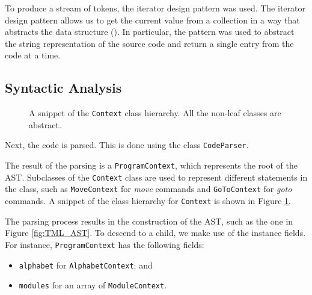 To produce a stream of tokens, the iterator design pattern was used. The iterator design pattern allows us to get the current value from a collection in a way that abstracts the data structure (\cite{gamma1995design}). In particular, the pattern was used to abstract the string representation of the source code and return a single entry from the code at a time. 

\subsection{Syntactic Analysis}
\begin{figure}[htb]
    \centering
    \caption{A snippet of the \texttt{Context} class hierarchy. All the non-leaf classes are abstract.}
    \label{fig:context_hierarchy}
\end{figure}

Next, the code is parsed. This is done using the class \texttt{CodeParser}. 

The result of the parsing is a \texttt{ProgramContext}, which represents the root of the AST. Subclasses of the \texttt{Context} class are used to represent different statements in the class, such as \texttt{MoveContext} for \textit{move} commands and \texttt{GoToContext} for \textit{goto} commands. A snippet of the class hierarchy for \texttt{Context} is shown in Figure \ref{fig:context_hierarchy}.

The parsing process results in the construction of the AST, such as the one in Figure \ref{fig:TML_AST}. To descend to a child, we make use of the instance fields. For instance, \texttt{ProgramContext} has the following fields:
\begin{itemize}
    \item \texttt{alphabet} for \texttt{AlphabetContext}; and
    \item \texttt{modules} for an array of \texttt{ModuleContext}.
\end{itemize}

